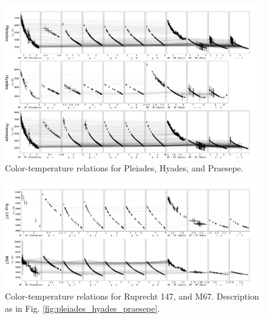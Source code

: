 \documentclass{aa}
\begin{document}
   \begin{figure}
		\centering
           \includegraphics[angle=90, width=0.8\hsize]{pics/clusters/Teff_spread_young.png}

      \caption{Color-temperature relations for Pleiades, Hyades, and Praesepe.}
         \label{fig:teff_pleiades_hyades_praesepe}
   \end{figure}
   

   \begin{figure}
		\centering
           \includegraphics[angle=90, width=0.56\hsize]{pics/clusters/Teff_spread_old.png}

      \caption{Color-temperature relations for Ruprecht 147, and M67. Description as in Fig. \ref{fig:pleiades_hyades_praesepe}.}
         \label{fig:teff_ngc6774_ngc2682}
   \end{figure}   

\end{document}
